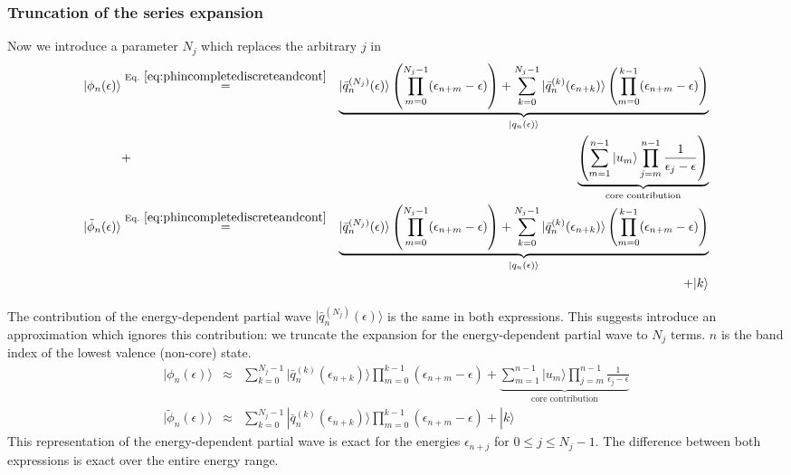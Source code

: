 \documentclass[11pt,a4paper]{report}
\begin{document}
\subsubsection{Truncation of the series expansion}
Now we introduce a parameter $N_j$ which replaces the arbitrary $j$
in 
\begin{eqnarray}
|\phi_n(\epsilon)\rangle
&\eqrel{eq:phincompletediscreteandcont}{=}&
\underbrace{
|\bar{q}_n^{(N_j)}(\epsilon)\rangle
\left(\prod_{m=0}^{N_j-1}(\epsilon_{n+m}-\epsilon)\right)
+
\sum_{k=0}^{N_j-1}
|\bar{q}_{n}^{(k)}(\epsilon_{n+k})\rangle
\left(\prod_{m=0}^{k-1}(\epsilon_{n+m}-\epsilon)\right)
}_{|q_n(\epsilon)\rangle}
\nonumber\\
&+&
\underbrace{
\left(\sum_{m=1}^{n-1}|u_m\rangle\prod_{j=m}^{n-1}\frac{1}{\epsilon_j-\epsilon}\right)
}_{\text{core contribution}}
\label{eq:phinofeexact}
\\
|\tilde{\phi}_n(\epsilon)\rangle
&\eqrel{eq:phincompletediscreteandcont}{=}&
\underbrace{
|\bar{q}_n^{(N_j)}(\epsilon)\rangle
\left(\prod_{m=0}^{N_j-1}(\epsilon_{n+m}-\epsilon)\right)
+
\sum_{k=0}^{N_j-1}
|\bar{q}_{n}^{(k)}(\epsilon_{n+k})\rangle
\left(\prod_{m=0}^{k-1}(\epsilon_{n+m}-\epsilon)\right)
}_{|q_n(\epsilon)\rangle}
\nonumber\\
&&+|k\rangle
\label{eq:phitildenofeexact}
\end{eqnarray}

The contribution of the energy-dependent partial wave
$|\bar{q}_n^{(N_j)}(\epsilon)\rangle$ is the same in both expressions.
This suggests introduce an approximation which ignores this
contribution: we truncate the expansion for the energy-dependent
partial wave to $N_j$ terms. $n$ is the band index of the lowest
valence (non-core) state.
\begin{eqnarray}
|\phi_n(\epsilon)\rangle
&\approx&
\sum_{k=0}^{N_j-1}
|\bar{q}_{n}^{(k)}(\epsilon_{n+k})\rangle
\prod_{m=0}^{k-1}(\epsilon_{n+m}-\epsilon)
+
\underbrace{
\sum_{m=1}^{n-1}|u_m\rangle\prod_{j=m}^{n-1}\frac{1}{\epsilon_j-\epsilon}
}_{\text{core contribution}}
\nonumber\\
|\tilde{\phi}_n(\epsilon)\rangle
&\approx&
\sum_{k=0}^{N_j-1}
|\bar{q}_{n}^{(k)}(\epsilon_{n+k})\rangle
\prod_{m=0}^{k-1}(\epsilon_{n+m}-\epsilon)
+|k\rangle
\label{eq:truncatedpspartialwithk}
\end{eqnarray}
This representation of the energy-dependent partial wave is exact for
the energies $\epsilon_{n+j}$ for $0\le j\le N_j-1$. The difference
between both expressions is exact over the entire energy range.
\end{document}
